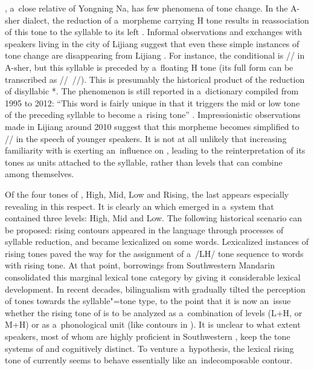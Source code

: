 , a~close relative of Yongning Na, has few phenomena of tone change. In the A-sher dialect, the
reduction of a~morpheme carrying H tone results in reassociation of this tone to the syllable to its
left \citep{michaud2006d,michaudetal2007d}. Informal observations and exchanges with
 speakers living in the city of Lijiang suggest that even these simple instances of tone change
are disappearing from Lijiang . For instance, the conditional is // in A-sher, but this syllable is preceded by a~floating H tone (its full form can be transcribed as //~//). This is presumably the historical
product of the reduction of disyllabic *. The phenomenon is still reported in
a~dictionary compiled from 1995 to 2012: “This word is fairly unique in that it triggers the mid
or low tone of the preceding syllable to become a~rising tone”
\citep[337]{pinsonetal2012}. Impressionistic observations made in Lijiang around 2010 suggest that this
morpheme becomes simplified to // in the speech of younger speakers. It is not at all
unlikely that increasing familiarity with  is exerting an~influence on , leading to the
reinterpretation of its tones as units attached to the syllable, rather than levels that can combine
among themselves.

Of the four tones of , High, Mid, Low and Rising, the last appears especially revealing in this
respect. It is clearly an  which emerged in a~system that contained three
levels: High, Mid and Low. The following historical scenario can be proposed: rising contours appeared in the  language
through processes of syllable reduction, and became lexicalized on some words. Lexicalized instances of rising tones paved the way
for the assignment of a~/LH/ tone sequence to  words with rising tone. At that point, borrowings from Southwestern Mandarin consolidated this marginal lexical tone category by giving it considerable lexical development. In recent decades, bilingualism with  gradually tilted the perception of  tones
towards the syllable"=tone type, to the point that it is now an~issue whether the rising tone of 
is to be analyzed as a~combination of levels (L+H, or M+H) or as a~phonological unit (like contours in ). It is unclear to what extent  speakers, most of whom are
highly proficient in Southwestern , keep the tone systems of  and  cognitively
distinct. To venture a~hypothesis, the lexical
rising tone of  currently seems to behave essentially like an~indecomposable {contour}.

